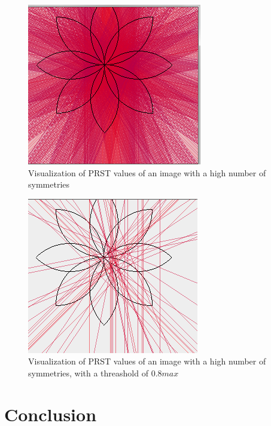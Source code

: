 \documentclass[10pt,a4paper]{article}			%
\begin{document}
\begin{figure}[h]
\centering
 \includegraphics[scale = 0.7]{img/rosace_5000.png}
 \caption{Visualization of PRST values of an image with a high number of symmetries}
 \label{rosace}
\end{figure}


\begin{figure}[h!]
\centering
 \includegraphics[scale = 0.7]{img/rosace_2000_seuil08.png}
 \caption{Visualization of PRST values of an image with a high number of symmetries, with a threashold of $0.8max$}
 \label{rosace 2}
\end{figure}


	\section*{Conclusion}

\nocite{*}


		
\end{document}
